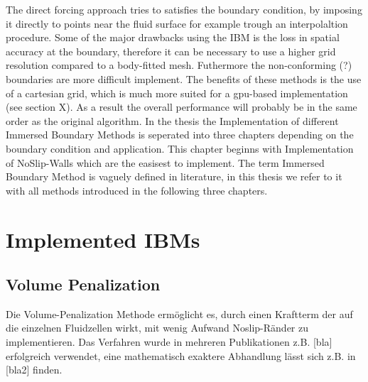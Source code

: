 The direct forcing approach tries to satisfies the boundary condition, by imposing it directly to points near the fluid surface for example
trough an interpolaltion procedure.
Some of the major drawbacks using the IBM is the loss in  spatial accuracy at the boundary, therefore it can be necessary to use a higher grid resolution
compared to a body-fitted mesh.  Futhermore the non-conforming (?) boundaries are more difficult implement.
The benefits of these methods is the use of a cartesian grid, which is much more suited for a gpu-based implementation (see section X).
As a result the overall performance will probably be in the same order as the original algorithm.
In the thesis the Implementation of different Immersed Boundary Methods is seperated into three chapters depending on the boundary condition and application.
This chapter beginns with Implementation of NoSlip-Walls which are the easisest to implement.
The term Immersed Boundary Method is vaguely defined in literature, in this thesis we refer to it with all methods introduced in the following three chapters.


\section{Implemented IBMs}
\subsection{Volume Penalization}
Die Volume-Penalization Methode ermöglicht es, durch einen Kraftterm der auf die einzelnen Fluidzellen wirkt, mit wenig Aufwand Noslip-Ränder zu implementieren.
Das Verfahren wurde in mehreren Publikationen z.B. [bla] erfolgreich verwendet, eine mathematisch exaktere Abhandlung lässt sich z.B. in [bla2] finden.

